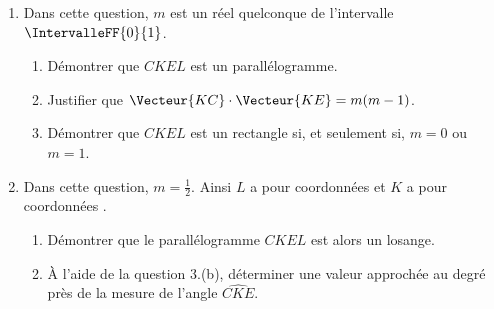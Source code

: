 \begin{enumerate}[resume]
	\item Dans cette question, $m$ est un réel quelconque de l’intervalle $\IntervalleFF{0}{1}$.
	\begin{enumerate}
		\item Démontrer que $CKEL$ est un parallélogramme.
		\item Justifier que $\Vecteur{KC}\cdot\Vecteur{KE}=m(m-1)$.
		\item Démontrer que $CKEL$ est un rectangle si, et seulement si, $m = 0$ ou $m = 1$.
	\end{enumerate}
	\item Dans cette question, $m=\frac12$. Ainsi $L$ a pour coordonnées  et $K$ a pour coordonnées .
	\begin{enumerate}
		\item Démontrer que le parallélogramme $CKEL$ est alors un losange.
		\item À l’aide de la question {3.(b)}, déterminer une valeur approchée au degré près de la mesure de l’angle $\widehat{CKE}$.
	\end{enumerate}
\end{enumerate}